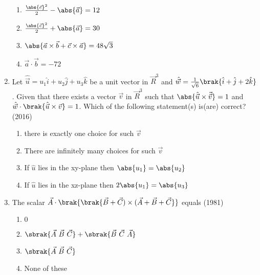 \begin{enumerate}[label=\thesubsection.\arabic*.,ref=\thesubsection.\theenumi]
  \begin{multicols}{2}
		\begin{enumerate}
			\item $\frac{\abs{\vec{c}}^2}{2}-\abs{\vec{a}}=12$
			\item $\frac{\abs{\vec{c}}^2}{2}+\abs{\vec{a}}=30$
			\item $\abs{\vec{a}\times \vec{b}+\vec{c}\times \vec{a}}=48\sqrt{3}$
			\item $\vec{a}\cdot\vec{b}=-72$
		\end{enumerate}
  \end{multicols}
	\item Let $\hat{\vec{u}}=u_1\hat{i}+u_2\hat{j}+u_3\hat{k}$ be a unit vector in $\vec{R}^3$ and $\hat{\vec{w}}=\frac{1}{\sqrt{6}}\brak{\hat{i}+\hat{j}+2\hat{k}}$. Given that there exists a vector $\vec{v}$ in $\vec{R}^3$ 
		such that $\abs{\hat{\vec{u}} \times \vec{\vec{v}}}=1$ and $\hat{\vec{w}}\cdot \brak{\hat{\vec{u}}\times \vec{v}}=1$. Which of the following statement(s) is(are) correct? \hfill{(2016)}
  \begin{multicols}{2}
		\begin{enumerate}
			\item there is exactly one choice for such $\vec{v}$
			\item There are infinitely many choices for such $\vec{v}$
			\item If $\hat{u}$ lies in the xy-plane then $\abs{u_1}= \abs{u_2}$
			\item If $\hat{u}$ lies in the xz-plane then $2\abs{u_1}=\abs{u_3}$
		\end{enumerate}
  \end{multicols}
\item The scalar $\vec{A}\cdot \brak{\brak{\vec{B}+\vec{C})\times(\vec{A}+\vec{B}+\vec{C}}}$ equals
\hfill (1981)
  \begin{multicols}{2}
\begin{enumerate}
\item  $0$
\item $\sbrak{\vec{A}\ \vec{B}\ \vec{C}} + \sbrak{\vec{B}\ \vec{C}\ \vec{A}}$
\item $\sbrak{\vec{A}\ \vec{B}\ \vec{C}}$
\item None of these
\end{enumerate}
  \end{multicols}


\end{enumerate}
